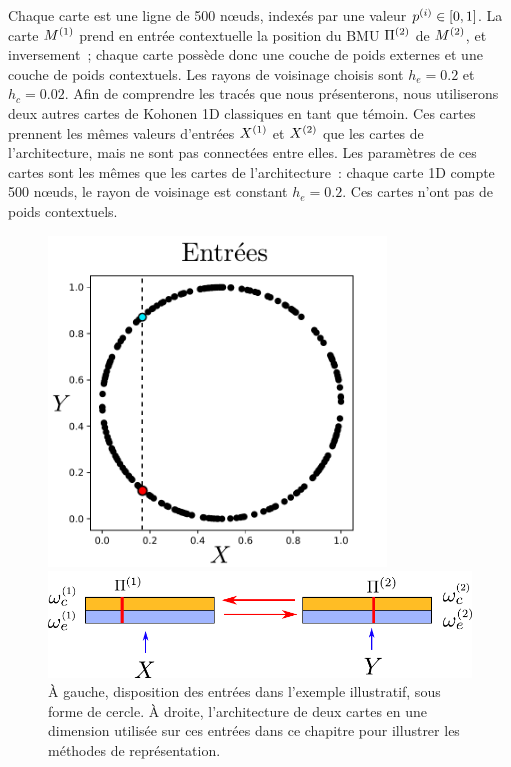 \documentclass[../main]{subfiles}
\begin{document}
Chaque carte est une ligne de 500 n\oe{}uds, indexés par une valeur $p^{({i})} \in [0,1]$.
La carte $M^{({1})}$ prend en entrée contextuelle la position du BMU $\Pi^{({2})}$ de $M^{({2})}$, et inversement~; chaque carte possède donc une couche de poids externes et une couche de poids contextuels. Les rayons de voisinage choisis sont $h_e = 0.2$ et $h_c = 0.02$.
Afin de comprendre les tracés que nous présenterons, nous utiliserons deux autres cartes de Kohonen 1D classiques en tant que témoin.
Ces cartes prennent les mêmes valeurs d'entrées $X^{({1})}$ et $X^{({2})}$ que les cartes de l'architecture, mais ne sont pas connectées entre elles. 
Les paramètres de ces cartes sont les mêmes que les cartes de l'architecture~: chaque carte 1D compte 500 n\oe{}uds, le rayon de voisinage est constant $h_e = 0.2$. Ces cartes n'ont pas de poids contextuels.


\begin{figure}
\begin{minipage}{0.4\textwidth}
\centering
\includegraphics[width=0.8\textwidth]{2som_inp_noinformation}
\end{minipage}
\begin{minipage}{0.6\textwidth}
\includegraphics[width=\textwidth]{2som_archi}
\end{minipage}
\caption{\`A gauche, disposition des entrées dans l'exemple illustratif, sous forme de cercle. \`A droite, l'architecture de deux cartes en une dimension utilisée sur ces entrées dans ce chapitre pour illustrer les méthodes de représentation.\label{fig:exp}}
\end{figure}
\end{document}
